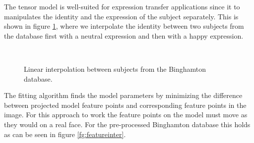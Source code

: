 \documentclass[11pt,a4paper,twoside]{report}
\begin{document}
The tensor model is well-suited for expression transfer applications since it to
manipulates the identity and the expression of the subject separately. This
is shown in figure \ref{fg:faceidinter}, where we interpolate the identity
between two subjects from the database first with a neutral expression
and then with a happy expression.

\begin{figure}[H]
\centering
{}\\

\caption{Linear interpolation between subjects from the Binghamton database.}\label{fg:faceidinter}
\end{figure}

The fitting algorithm finds the model parameters by minimizing the difference
between projected model feature points and corresponding feature points in the
image. For this approach to work the feature points on the model must move as
they would on a real face. For the pre-processed Binghamton database this holds as can be
seen in figure \ref{fg:featureinter}.
\end{document}
